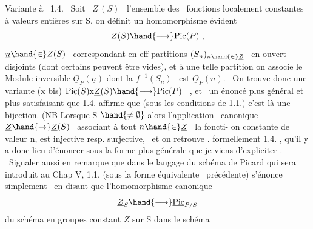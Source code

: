 Variante à \ 1.4. \ Soit \ $\underline{Z}\,(S)$ \ l'ensemble des \ fonctions localement
constantes à valeurs entières sur S, on définit un homomorphisme évident
\[ Z(S) \hand{\longrightarrow} \mathrm{Pic}(P) \ , \]
  $\underline{n} \hand{\in} Z(S)$ \ correspondant en eff   partitions $(S_n)_{n\hand{\in}\underline{Z}}$ \ en ouvert
disjoints (dont certains peuvent être vides),  et  à une
telle partition on associe le Module inversible $\underline{O}_P(\underline{n})$ dont la  
$f^{-1}(S_n)$ \ est $\underline{O}_P(n)$. \ On trouve donc une variante
(x bis) \hfill $\mathrm{Pic}(S)\mathrm{x}\underline{Z}(S) \hand{\longrightarrow} \mathrm{Pic}(P)$ \ , \hfill
et \ un énoncé plus général et plus satisfaisant que 1.4. affirme que
(sous les conditions de 1.1.) c'est là une bijection. (NB Lorsque S $\hand{\neq \emptyset}$
alors l'application \ canonique $\underline{Z} \hand{\to} \underline{Z}(S)$ \ associant à tout $n \hand{\in} \underline{Z}$ \ la foncti-%
on constante de valeur n, est injective resp. surjective, \ et on retrouve .
formellement 1.4. , qu'il y a donc lieu d'énoncer sous la forme plus
générale que je viens d'expliciter . \ Signaler aussi en remarque que
dans le langage du schéma de Picard qui sera introduit au Chap V, 1.1.
(sous la forme équivalente \ précédente) s'énonce simplement \ en disant que
l'homomorphisme canonique
\[ \underline{Z}_S \hand{\longrightarrow} \underline{\mathrm{Pic}}_{P/S} \]
du schéma en groupes constant  $\underline{Z}$ sur S dans le schéma\margin{\ensuremath{\backslash}}

